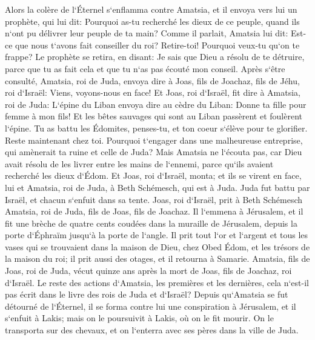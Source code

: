 \verse Alors la colère de l`Éternel s`enflamma contre Amatsia, et il envoya vers lui un prophète, qui lui dit: Pourquoi as-tu recherché les dieux de ce peuple, quand ils n`ont pu délivrer leur peuple de ta main? 
\verse Comme il parlait, Amatsia lui dit: Est-ce que nous t`avons fait conseiller du roi? Retire-toi! Pourquoi veux-tu qu`on te frappe? Le prophète se retira, en disant: Je sais que Dieu a résolu de te détruire, parce que tu as fait cela et que tu n`as pas écouté mon conseil. 
\verse Après s`être consulté, Amatsia, roi de Juda, envoya dire à Joas, fils de Joachaz, fils de Jéhu, roi d`Israël: Viens, voyons-nous en face! 
\verse Et Joas, roi d`Israël, fit dire à Amatsia, roi de Juda: L`épine du Liban envoya dire au cèdre du Liban: Donne ta fille pour femme à mon fils! Et les bêtes sauvages qui sont au Liban passèrent et foulèrent l`épine. 
\verse Tu as battu les Édomites, penses-tu, et ton coeur s`élève pour te glorifier. Reste maintenant chez toi. Pourquoi t`engager dans une malheureuse entreprise, qui amènerait ta ruine et celle de Juda? 
\verse Mais Amatsia ne l`écouta pas, car Dieu avait résolu de les livrer entre les mains de l`ennemi, parce qu`ils avaient recherché les dieux d`Édom. 
\verse Et Joas, roi d`Israël, monta; et ils se virent en face, lui et Amatsia, roi de Juda, à Beth Schémesch, qui est à Juda. 
\verse Juda fut battu par Israël, et chacun s`enfuit dans sa tente. 
\verse Joas, roi d`Israël, prit à Beth Schémesch Amatsia, roi de Juda, fils de Joas, fils de Joachaz. Il l`emmena à Jérusalem, et il fit une brèche de quatre cents coudées dans la muraille de Jérusalem, depuis la porte d`Éphraïm jusqu`à la porte de l`angle. 
\verse Il prit tout l`or et l`argent et tous les vases qui se trouvaient dans la maison de Dieu, chez Obed Édom, et les trésors de la maison du roi; il prit aussi des otages, et il retourna à Samarie. 
\verse Amatsia, fils de Joas, roi de Juda, vécut quinze ans après la mort de Joas, fils de Joachaz, roi d`Israël. 
\verse Le reste des actions d`Amatsia, les premières et les dernières, cela n`est-il pas écrit dans le livre des rois de Juda et d`Israël? 
\verse Depuis qu`Amatsia se fut détourné de l`Éternel, il se forma contre lui une conspiration à Jérusalem, et il s`enfuit à Lakis; mais on le poursuivit à Lakis, où on le fit mourir. 
\verse On le transporta sur des chevaux, et on l`enterra avec ses pères dans la ville de Juda. 

